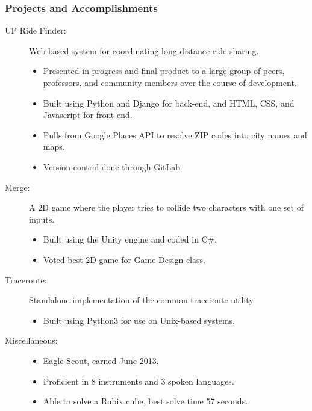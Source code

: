\documentclass{article}
\begin{document}
\subsubsection*{Projects and Accomplishments}
    \begin{description}
        \item[UP Ride Finder:] Web-based system for coordinating long distance ride sharing.
            \begin{itemize}
                \item Presented in-progress and final product to a large group of peers, professors, and community members over the course of development.
                \item Built using Python and Django for back-end, and HTML, CSS, and Javascript for front-end.
                \item Pulls from Google Places API to resolve ZIP codes into city names and maps.
                \item Version control done through GitLab.
            \end{itemize}

            \vspace{0.5em}

        \item[Merge:] A 2D game where the player tries to collide two characters with one set of inputs.
            \begin{itemize}
                \item Built using the Unity engine and coded in C\#.
                \item Voted best 2D game for Game Design class.
            \end{itemize}

            \vspace{0.5em}

        \item[Traceroute:] Standalone implementation of the common traceroute utility.
            \begin{itemize}
                \item Built using Python3 for use on Unix-based systems.
            \end{itemize}

            \vspace{0.5em}

        \item[Miscellaneous:] \hfill
            \begin{itemize}
                \item Eagle Scout, earned June 2013.
                \item Proficient in 8 instruments and 3 spoken languages.
                \item Able to solve a Rubix cube, best solve time 57 seconds.
        \end{itemize}
    \end{description}
\end{document}
